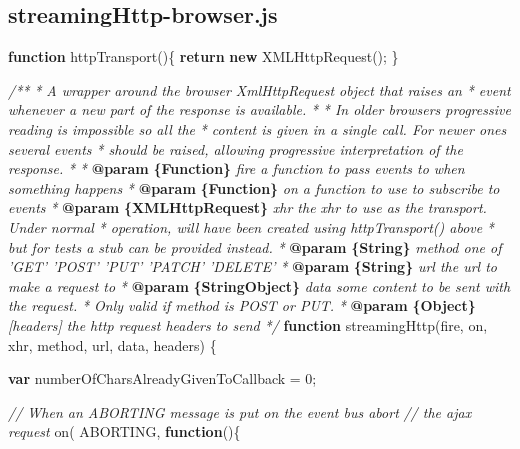 \documentclass[]{article}
\newenvironment{Shaded}{}{}
\newcommand{\KeywordTok}[1]{\textcolor[rgb]{0.00,0.44,0.13}{\textbf{{#1}}}}
\newcommand{\DecValTok}[1]{\textcolor[rgb]{0.25,0.63,0.44}{{#1}}}
\newcommand{\CommentTok}[1]{\textcolor[rgb]{0.38,0.63,0.69}{\textit{{#1}}}}
\newcommand{\FunctionTok}[1]{\textcolor[rgb]{0.02,0.16,0.49}{{#1}}}
\newcommand{\NormalTok}[1]{{#1}}
\begin{document}
\pagebreak

\subsection{streamingHttp-browser.js}

\begin{Shaded}
\begin{Highlighting}[]
\KeywordTok{function} \FunctionTok{httpTransport}\NormalTok{()\{}
   \KeywordTok{return} \KeywordTok{new} \FunctionTok{XMLHttpRequest}\NormalTok{();}
\NormalTok{\}}

\CommentTok{/**}
\CommentTok{ * A wrapper around the browser XmlHttpRequest object that raises an }
\CommentTok{ * event whenever a new part of the response is available.}
\CommentTok{ * }
\CommentTok{ * In older browsers progressive reading is impossible so all the }
\CommentTok{ * content is given in a single call. For newer ones several events}
\CommentTok{ * should be raised, allowing progressive interpretation of the response.}
\CommentTok{ *      }
\CommentTok{ * }\KeywordTok{@param}\CommentTok{ }\KeywordTok{\{Function\}}\CommentTok{ fire a function to pass events to when something happens}
\CommentTok{ * }\KeywordTok{@param}\CommentTok{ }\KeywordTok{\{Function\}}\CommentTok{ on a function to use to subscribe to events}
\CommentTok{ * }\KeywordTok{@param}\CommentTok{ }\KeywordTok{\{XMLHttpRequest\}}\CommentTok{ xhr the xhr to use as the transport. Under normal}
\CommentTok{ *          operation, will have been created using httpTransport() above}
\CommentTok{ *          but for tests a stub can be provided instead.}
\CommentTok{ * }\KeywordTok{@param}\CommentTok{ }\KeywordTok{\{String\}}\CommentTok{ method one of 'GET' 'POST' 'PUT' 'PATCH' 'DELETE'}
\CommentTok{ * }\KeywordTok{@param}\CommentTok{ }\KeywordTok{\{String\}}\CommentTok{ url the url to make a request to}
\CommentTok{ * }\KeywordTok{@param}\CommentTok{ }\KeywordTok{\{String\textbar{}Object\}}\CommentTok{ data some content to be sent with the request.}
\CommentTok{ *                        Only valid if method is POST or PUT.}
\CommentTok{ * }\KeywordTok{@param}\CommentTok{ }\KeywordTok{\{Object\}}\CommentTok{ [headers] the http request headers to send                       }
\CommentTok{ */}  
\KeywordTok{function} \FunctionTok{streamingHttp}\NormalTok{(fire, on, xhr, method, url, data, headers) \{}
        
   \KeywordTok{var} \NormalTok{numberOfCharsAlreadyGivenToCallback = }\DecValTok{0}\NormalTok{;}

   \CommentTok{// When an ABORTING message is put on the event bus abort }
   \CommentTok{// the ajax request         }
   \FunctionTok{on}\NormalTok{( ABORTING, }\KeywordTok{function}\NormalTok{()\{}
  

\end{Highlighting}
\end{Shaded}
\end{document}
